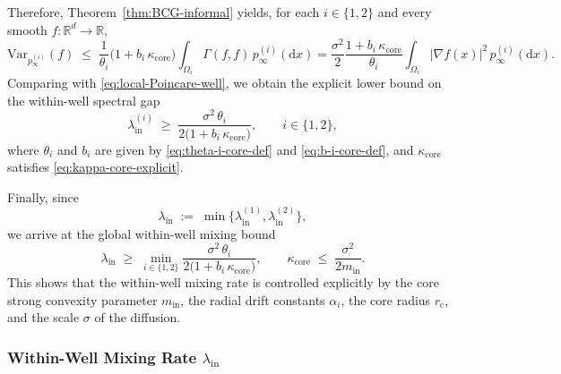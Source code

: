 Therefore, Theorem~\ref{thm:BCG-informal} yields, for each
\(i\in\{1,2\}\) and every smooth \(f:\mathbb R^d\to\mathbb R\),
\[
\mathrm{Var}_{p_\infty^{(i)}}(f)
\;\le\;
\frac{1}{\theta_i}\bigl(1 + b_i\,\kappa_{\mathrm{core}}\bigr)
\int_{\Omega_i} \Gamma(f,f)\,p_\infty^{(i)}(\mathrm dx)
=
\frac{\sigma^2}{2}\frac{1 + b_i\,\kappa_{\mathrm{core}}}{\theta_i}
\int_{\Omega_i} |\nabla f(x)|^2\,p_\infty^{(i)}(\mathrm dx).
\]
Comparing with \eqref{eq:local-Poincare-well}, we obtain the explicit lower
bound on the within-well spectral gap
\begin{equation}\label{eq:lambda-in-i-lower-bound-core}
\lambda_{\mathrm{in}}^{(i)}
\;\ge\;
\frac{\sigma^2\,\theta_i}{2\bigl(1 + b_i\,\kappa_{\mathrm{core}}\bigr)},
\qquad
i\in\{1,2\},
\end{equation}
where \(\theta_i\) and \(b_i\) are given by
\eqref{eq:theta-i-core-def} and \eqref{eq:b-i-core-def}, and
\(\kappa_{\mathrm{core}}\) satisfies \eqref{eq:kappa-core-explicit}.

Finally, since
\[
\lambda_{\mathrm{in}}
\;:=\;
\min\bigl\{\lambda_{\mathrm{in}}^{(1)},\lambda_{\mathrm{in}}^{(2)}\bigr\},
\]
we arrive at the global within-well mixing bound
\begin{equation}\label{eq:lambda-in-global-core}
\lambda_{\mathrm{in}}
\;\ge\;
\min_{i\in\{1,2\}}
\frac{\sigma^2\,\theta_i}{2\bigl(1 + b_i\,\kappa_{\mathrm{core}}\bigr)},
\qquad
\kappa_{\mathrm{core}}
\;\le\;
\frac{\sigma^2}{2m_{\mathrm{in}}}.
\end{equation}
This shows that the within-well mixing rate is controlled explicitly by
the core strong convexity parameter \(m_{\mathrm{in}}\), the radial drift
constants \(\alpha_i\), the core radius \(r_{\mathrm c}\), and the scale
\(\sigma\) of the diffusion.

\subsubsection{Within-Well Mixing Rate \texorpdfstring{$\lambda_{\mathrm{in}}$}{lambda_in}}
\label{sec:within-well-v2}

